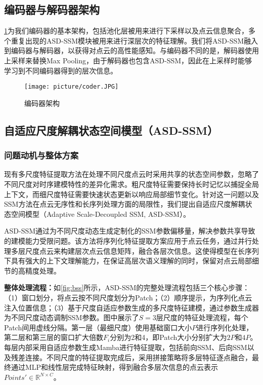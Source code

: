 \documentclass[preprint,12pt]{elsarticle}
\begin{document}
\subsection{编码器与解码器架构}
\cref{fig:coder}为我们编码器的基本架构，包括池化层被用来进行下采样以及点云信息聚合，多个重复出现的ASD-SSM模块被用来进行深层次的特征理解。我们将ASD-SSM融入到编码器与解码器，以获得对点云的高性能感知。与编码器不同的是，解码器使用上采样来替换Max Pooling，由于解码器也包含ASD-SSM，因此在上采样时能够学习到不同编码器得到的层次信息。

\begin{figure}[htbp]
	\centering
	\texttt{[image: picture/coder.JPG]}
	\caption{编码器架构}
	\label{fig:coder}
\end{figure}
\subsection{自适应尺度解耦状态空间模型（ASD-SSM）}

\subsubsection{问题动机与整体方案}

现有多尺度特征提取方法在处理不同尺度点云时采用共享的状态空间参数，忽略了不同尺度对时序建模特性的差异化需求。粗尺度特征需要保持长时记忆以捕捉全局上下文，而细尺度特征需要快速状态更新以响应局部细节变化。针对这一问题以及SSM方法在点云无序性和长序列处理方面的局限性，我们提出自适应尺度解耦状态空间模型（Adaptive Scale-Decoupled SSM, ASD-SSM）。

ASD-SSM通过为不同尺度动态生成定制化的SSM参数偏移量，解决参数共享导致的建模能力受限问题。该方法将序列化特征提取方案应用于点云任务，通过并行处理多层尺度点云来构建层次点云信息矩阵，融合各层次信息。这使得模型在长序列下具有强大的上下文理解能力，在保证高层次语义理解的同时，保留对点云局部细节的高精度处理。

\textbf{整体处理流程：}如\cref{fig:bss}所示，ASD-SSM的完整处理流程包括三个核心步骤：（1）窗口划分，将点云按不同尺度划分为Patch；（2）顺序提示，为序列化点云注入位置信息；（3）基于尺度自适应参数生成的多尺度特征建模，通过参数生成器为不同尺度动态调制SSM参数。图中展示了$S=3$层尺度的特征处理流程，每个Patch间用虚线分隔。第一层（最细尺度）使用基础窗口大小$P$进行序列化处理，第二层和第三层的窗口扩大倍数$F_i$分别为2和4，即Patch大小分别扩大为$2P$和$4P$。每层内部采用自适应参数生成Mamba进行特征提取，包括前向SSM、后向SSM以及残差连接。不同尺度的特征提取完成后，采用拼接策略将多层特征逐点融合，最终通过MLP和线性层完成特征映射，得到融合多层次信息的点云表示$Points'\in\mathbb{R}^{N\times C}$。
\end{document}
